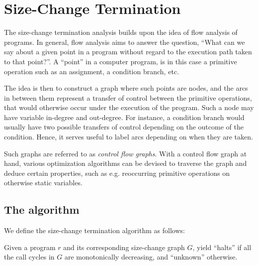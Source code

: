\chapter{Size-Change Termination}\label{section:size-change-termination}

The size-change termination analysis builds upon the idea of flow analysis of
programs. In general, flow analysis aims to answer the question, ``What can we
say about a given point in a program without regard to the execution path taken
to that point?''. A ``point'' in a computer program, is in this case a primitive
operation such as an assignment, a condition branch, etc.

The idea is then to construct a graph where such points are nodes, and the arcs
in between them represent a transfer of control between the primitive
operations, that would otherwise occur under the execution of the program.
Such a node may have variable in-degree and out-degree. For instance, a
condition branch would usually have two possible transfers of control depending
on the outcome of the condition. Hence, it serves useful to label arcs
depending on when they are taken.

Such graphs are referred to as \emph{control flow graphs}. With a control flow
graph at hand, various optimization algorithms can be devised to traverse the
graph and deduce certain properties, such as e.g.  reoccurring primitive
operations on otherwise static variables\cite{kildall}.





\section{The algorithm}

We define the size-change termination algorithm as follows:

\begin{definition} Given a program $r$ and its corresponding size-change graph
$G$, yield ``halts'' if all the call cycles in $G$ are monotonically
decreasing, and ``unknown'' otherwise.\end{definition}
